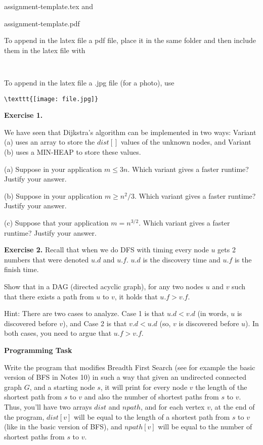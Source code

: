 \documentclass[11pt]{article}
\begin{document}
\begin{enumerate}
           assignment-template.tex	and
           
          assignment-template.pdf


To append in the  latex file  a pdf file, place it  in the same folder and then include them  in the latex file with 
\begin{verbatim}


\end{verbatim}
To append in the  latex file a .jpg file (for a photo), use 
\begin{verbatim}
\texttt{[image: file.jpg]}

\end{verbatim}


\end{enumerate}
\newpage


\textbf{Exercise 1.}

We have seen that Dijkstra's algorithm can be implemented in two ways: Variant (a) uses an array to store the $dist[]$ values of the unknown nodes, and Variant (b) uses a MIN-HEAP to store these values.
\medskip

(a) Suppose in your application $m \le 3n$. Which variant gives a faster runtime?  Justify your answer.


(b) Suppose in your application $m \ge n^2/3$. Which variant gives a faster runtime?  Justify your answer.

(c) Suppose that your application $m = n^{3/2}$.   Which variant gives a faster runtime?  Justify your answer.

\bigskip


\textbf{Exercise 2.}   Recall that when we do DFS with timing every node $u$ gets 2 numbers that were denoted $u.d$ and $u.f$.   $u.d$ is the discovery time and $u.f$ is the finish time.   

Show that in a DAG (directed acyclic graph),  for any two nodes $u$ and $v$ such that there exists a path from $u$ to $v$, it holds that $u.f > v. f$.

Hint: There are two cases to analyze. Case 1 is that $u.d < v.d$ (in words, $u$ is discovered before $v$), and Case 2 is that $v.d < u.d$ (so, $v$ is discovered before $u$). In both cases, you need to argue that $u.f > v.f$.

\newpage
\textbf{Programming Task}

Write the program that modifies Breadth First Search  (see for example  the basic version of BFS in Notes 10) in such a way that given an undirected connected graph $G$, and a starting node $s$, it will print for every node $v$ the length of the shortest path from $s$ to $v$ and also the number of shortest paths from $s$ to $v$. Thus, you'll have two arrays $dist$ and $npath$, and for each vertex $v$, at the end of the program, $dist[v]$ will be equal to the length of a shortest path from $s$ to $v$ (like in the basic version of BFS), and $npath[v]$ will be equal to the number of shortest paths from $s$ to $v$.
\end{document}

